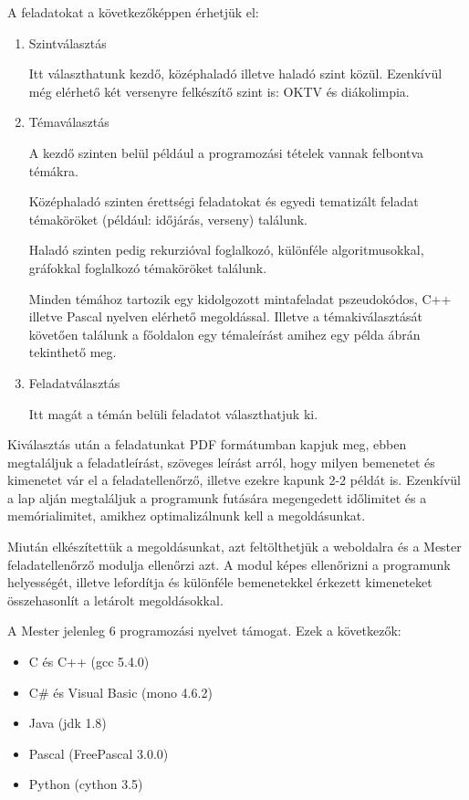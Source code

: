 A feladatokat a következőképpen érhetjük el:
\begin{enumerate}
    \item Szintválasztás

          Itt választhatunk kezdő, középhaladó illetve haladó szint közül. Ezenkívül még elérhető két versenyre felkészítő szint is: OKTV és diákolimpia.

    \item Témaválasztás

          A kezdő szinten belül például a programozási tételek vannak felbontva témákra.

          Középhaladó szinten érettségi feladatokat és egyedi tematizált feladat témaköröket (például: időjárás, verseny) találunk.

          Haladó szinten pedig rekurzióval foglalkozó, különféle algoritmusokkal, gráfokkal foglalkozó témaköröket találunk.

          Minden témához tartozik egy kidolgozott mintafeladat pszeudokódos, C++ illetve Pascal nyelven elérhető megoldással. Illetve a témakiválasztását követően találunk a főoldalon egy témaleírást amihez egy példa  ábrán tekinthető meg.

    \item Feladatválasztás

          Itt magát a témán belüli feladatot választhatjuk ki.
\end{enumerate}

Kiválasztás után a feladatunkat PDF formátumban kapjuk meg, ebben megtaláljuk a feladatleírást, szöveges leírást arról, hogy milyen bemenetet és kimenetet vár el a feladatellenőrző, illetve ezekre kapunk 2-2 példát is. Ezenkívül a lap alján megtaláljuk a programunk futására megengedett időlimitet és a memórialimitet, amikhez optimalizálnunk kell a megoldásunkat.

Miután elkészítettük a megoldásunkat, azt feltölthetjük a weboldalra és a Mester feladatellenőrző modulja ellenőrzi azt. A modul képes ellenőrizni a programunk helyességét, illetve lefordítja és különféle bemenetekkel érkezett kimeneteket összehasonlít a letárolt megoldásokkal.

A Mester jelenleg 6 programozási nyelvet támogat. Ezek a következők: \cite{elte-mester_tudnivalok}
\begin{itemize}
    \item C és C++ (gcc 5.4.0)
    \item C\# és Visual Basic (mono 4.6.2)
    \item Java (jdk 1.8)
    \item Pascal (FreePascal 3.0.0)
    \item Python (cython 3.5)
\end{itemize}

